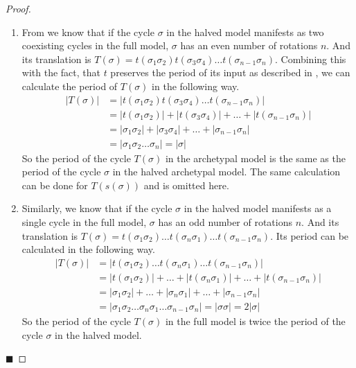 \begin{proof} \phantom{x}
	\begin{enumerate}
		\item From  we know that if the cycle $\sigma$ in the halved model manifests as two coexisting cycles in the full model, $\sigma$ has an even number of rotations $n$.
		      And its translation is $T(\sigma) = t(\sigma_1\sigma_2) t(\sigma_3\sigma_4) \dots t(\sigma_{n-1}\sigma_n)$.
		      Combining this with the fact, that $t$ preserves the period of its input as described in , we can calculate the period of $T(\sigma)$ in the following way.
		      \begin{align*}
			      |T(\sigma)| & = |t(\sigma_1\sigma_2) t(\sigma_3\sigma_4) \dots t(\sigma_{n-1}\sigma_n)|           \\
			                  & = |t(\sigma_1\sigma_2)| + |t(\sigma_3\sigma_4)| + \dots + |t(\sigma_{n-1}\sigma_n)| \\
			                  & = |\sigma_1\sigma_2| + |\sigma_3\sigma_4| + \dots + |\sigma_{n-1}\sigma_n|          \\
			                  & = |\sigma_1\sigma_2 \dots \sigma_n| = |\sigma|
		      \end{align*}
		      So the period of the cycle $T(\sigma)$ in the archetypal model is the same as the period of the cycle $\sigma$ in the halved archetypal model.
		      The same calculation can be done for $T(s(\sigma))$ and is omitted here.
		\item Similarly, we know that if the cycle $\sigma$ in the halved model manifests as a single cycle in the full model, $\sigma$ has an odd number of rotations $n$.
		      And its translation is $T(\sigma) = t(\sigma_1\sigma_2) \dots t(\sigma_n\sigma_1) \dots t(\sigma_{n-1}\sigma_n)$.
		      Its period can be calculated in the following way.
		      \begin{align*}
			      |T(\sigma)| & = |t(\sigma_1\sigma_2) \dots t(\sigma_n\sigma_1) \dots t(\sigma_{n-1}\sigma_n)|                      \\
			                  & = |t(\sigma_1\sigma_2)| + \dots + |t(\sigma_n\sigma_1)| + \dots + |t(\sigma_{n-1}\sigma_n)|          \\
			                  & = |\sigma_1\sigma_2| + \dots + |\sigma_n\sigma_1| + \dots + |\sigma_{n-1}\sigma_n|                   \\
			                  & = |\sigma_1\sigma_2 \dots \sigma_n\sigma_1 \dots \sigma_{n-1}\sigma_n| = |\sigma\sigma| = 2 |\sigma|
		      \end{align*}
		      So the period of the cycle $T(\sigma)$ in the full model is twice the period of the cycle $\sigma$ in the halved model.
	\end{enumerate}
	\hfill $\blacksquare$
\end{proof}

